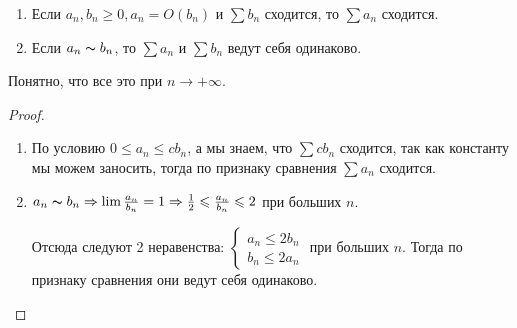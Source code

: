 \begin{follow}
    \begin{enumerate}
        \item Если $a_n, b_n \geqslant 0, a_n = O(b_n)$ и $\sum b_n$ сходится, то $\sum a_n$ сходится. 
        \item Если $a_n \thicksim b_n$, то $\sum a_n$ и $\sum b_n$ ведут себя одинаково.
    \end{enumerate}
    Понятно, что все это при $n \to +\infty$.
\end{follow}
\begin{proof} \quad 

    \begin{enumerate}
        \item По условию $0 \leqslant a_n \leqslant cb_n$, а мы знаем, что $\sum cb_n$ сходится, так как константу мы можем заносить, тогда по признаку сравнения $\sum a_n$ сходится.
        \item $a_n \thicksim b_n \Rightarrow \lim \frac{a_n}{b_n} = 1 \Rightarrow \frac{1}{2} \leqslant \frac{a_n}{b_n} \leqslant 2$ при больших $n$.
    
        Отсюда следуют 2 неравенства: $\begin{cases}
            a_n \leqslant 2b_n \\
            b_n \leqslant 2a_n
        \end{cases}$ при больших $n$. Тогда по признаку сравнения они ведут себя одинаково.
    \end{enumerate}
\end{proof}

\vspace{4mm}

